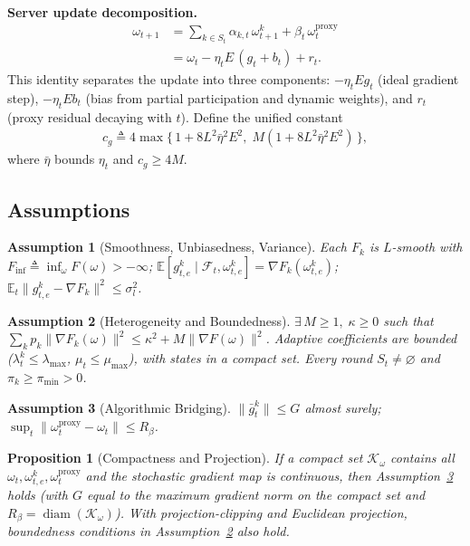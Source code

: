 \documentclass[journal]{IEEEtran}
\newtheorem{assumption}{Assumption}
\newtheorem{proposition}{Proposition}
\begin{document}
\noindent\textbf{Server update decomposition.}
\begin{align}
  \omega_{t+1}
  &= \sum_{k\in S_t}\alpha_{k,t}\,\omega_{t+1}^k + \beta_t\,\omega_t^{\mathrm{proxy}}  \\
  &= \omega_t - \eta_t E\,(g_t + b_t) + r_t.
  \label{eq:12}
\end{align}
This identity separates the update into three components:\;
\(-\eta_t E g_t\) (ideal gradient step),\;
\(-\eta_t E b_t\) (bias from partial participation and dynamic weights), and\;
\(r_t\) (proxy residual decaying with \(t\)).
Define the unified constant
\begin{align}
  c_g \triangleq 4\max\!\bigl\{\,1+8L^2\bar\eta^2 E^2,\; M(1+8L^2\bar\eta^2 E^2)\,\bigr\},
  \label{eq:13}
\end{align}
where \(\bar\eta\) bounds \(\eta_t\) and \(c_g \ge 4M\).

\subsection{Assumptions}

\begin{assumption}[Smoothness, Unbiasedness, Variance]\label{asmp:1}
  Each \(F_k\) is \(L\)-smooth with \(F_{\inf} \triangleq \inf_\omega F(\omega) > -\infty\);
  \(\mathbb E[g_{t,e}^k \mid \mathcal F_t, \omega_{t,e}^k] = \nabla F_k(\omega_{t,e}^k)\);
  \(\mathbb E_t\|g_{t,e}^k - \nabla F_k\|^2 \le \sigma_l^2\).
\end{assumption}

\begin{assumption}[Heterogeneity and Boundedness]\label{asmp:6}
  \(\exists\, M \ge 1,\;\kappa \ge 0\) such that
  \(\sum_k p_k \|\nabla F_k(\omega)\|^2 \le \kappa^2 + M\|\nabla F(\omega)\|^2\).
  Adaptive coefficients are bounded (\(\lambda_t^k \le \lambda_{\max}\), \(\mu_t \le \mu_{\max}\)), with states in a compact set.
  Every round \(S_t \neq \varnothing\) and \(\pi_k \ge \pi_{\min} > 0\).
\end{assumption}

\begin{assumption}[Algorithmic Bridging]\label{asmp:8}
  \(\|\bar g_t^k\| \le G\) almost surely;\;
  \(\sup_t \|\omega_t^{\mathrm{proxy}} - \omega_t\| \le R_\beta\).
\end{assumption}

\begin{proposition}[Compactness and Projection]\label{prop:1}
  If a compact set \(\mathcal K_\omega\) contains all \(\omega_t, \omega_{t,e}^k, \omega_t^{\mathrm{proxy}}\) and the stochastic gradient map is continuous, then Assumption~\ref{asmp:8} holds (with \(G\) equal to the maximum gradient norm on the compact set and \(R_\beta = \operatorname{diam}(\mathcal K_\omega)\)).
  With projection-clipping and Euclidean projection, boundedness conditions in Assumption~\ref{asmp:6} also hold.
\end{proposition}
\end{document}
